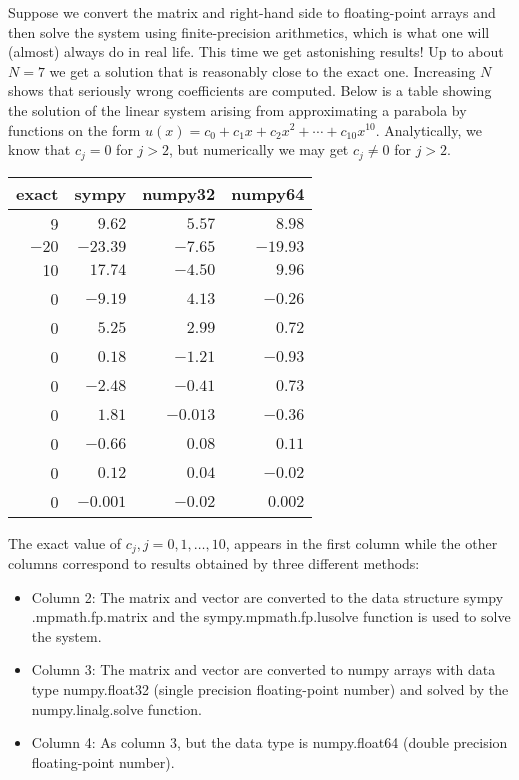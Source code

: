 \documentclass[../main.tex]{subfiles}
\begin{document}
	Suppose we convert the matrix and right-hand side to floating-point arrays and then solve the system using finite-precision arithmetics, which is what one will (almost) always do in real life. This time we get astonishing results! Up to about $N=7$ we get a solution that is reasonably close to the exact one. Increasing $N$ shows that seriously wrong coefficients are computed. Below is a table showing the solution of the linear system arising from approximating a parabola by functions on the form $u(x)=c_{0}+c_{1} x+c_{2} x^{2}+\cdots+c_{10} x^{10}$. Analytically, we know that $c_{j}=0$ for $j>2$, but numerically we may get $c_{j} \neq 0$ for $j>2$.
	
	\begin{tabular}{rrrr}
		\hline exact & sympy & numpy32 & numpy64 \\
		\hline 9 & $9.62$ & $5.57$ & $8.98$ \\
		$-20$ & $-23.39$ & $-7.65$ & $-19.93$ \\
		10 & $17.74$ & $-4.50$ & $9.96$ \\
		0 & $-9.19$ & $4.13$ & $-0.26$ \\
		0 & $5.25$ & $2.99$ & $0.72$ \\
		0 & $0.18$ & $-1.21$ & $-0.93$ \\
		0 & $-2.48$ & $-0.41$ & $0.73$ \\
		0 & $1.81$ & $-0.013$ & $-0.36$ \\
		0 & $-0.66$ & $0.08$ & $0.11$ \\
		0 & $0.12$ & $0.04$ & $-0.02$ \\
		0 & $-0.001$ & $-0.02$ & $0.002$ \\
		\hline
	\end{tabular}
	\bigbreak
	\noindent The exact value of $c_{j}, j=0,1, \ldots, 10$, appears in the first column while the other columns correspond to results obtained by three different methods:
	\begin{itemize}
		\item Column 2: The matrix and vector are converted to the data structure sympy .mpmath.fp.matrix and the sympy.mpmath.fp.lu\textunderscore solve function is used to solve the system.
		\item Column 3: The matrix and vector are converted to numpy arrays with data type numpy.float32 (single precision floating-point number) and solved by the numpy.linalg.solve function.
		\item Column 4: As column 3, but the data type is numpy.float64 (double precision floating-point number).
	\end{itemize}
	
\end{document}
